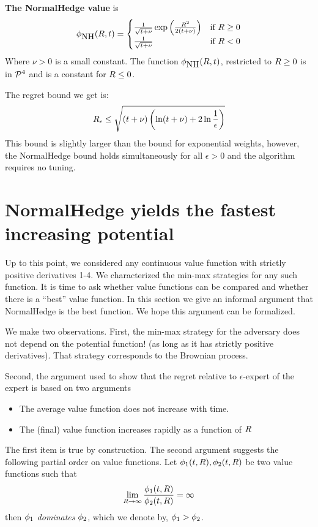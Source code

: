 \documentclass[12pt]{article} %
\begin{document}
{\bf The NormalHedge value} is
\begin{equation} \label{eqn:NormalHedge}
  \phi_{\mbox{NH}}(R,t) = \begin{cases}
    \frac{1}{\sqrt{t+\nu}}\exp\left(\frac{R^2}{2(t+\nu)}\right)
    & \mbox{if } R \geq 0  \\
  \frac{1}{\sqrt{t+\nu}} & \mbox{if } R <0
  \end{cases}
\end{equation}
Where $\nu>0$ is a small constant. The function $\phi_{\mbox{NH}}(R,t)$,
restricted to $R\geq 0$ is in ${\cal P}^{4}$ and is a constant for $R \leq 0$.

The regret bound we get is:
\begin{equation}
R_\epsilon \leq \sqrt{(t+\nu) \left( \ln (t+\nu) + 2 \ln \frac{1}{\epsilon}\right)}
\end{equation}
This bound is slightly larger than the bound for exponential weights,
however, the NormalHedge bound holds simultaneously for all
$\epsilon>0$ and the algorithm requires no tuning.


\section{NormalHedge yields the fastest increasing potential} \label{sec:NormalHedge}

Up to this point, we considered any continuous value function with
strictly positive derivatives 1-4. We characterized the min-max
strategies for any such function. It is time to ask whether value
functions can be compared and whether there is a ``best'' value
function. In this section we give an informal argument that
NormalHedge is the best function. We hope this argument can be
formalized.

We make two observations. First, the min-max strategy for the
adversary does not depend on the potential function! (as long as it
has strictly positive derivatives). That strategy corresponds to the
Brownian process.

Second, the argument used to show that the regret relative to
$\epsilon$-expert of the expert is based on two arguments
\begin{itemize}
\item The average value function does not increase with time.
\item The (final) value function increases rapidly as a function of $R$
\end{itemize}
The first item is true by construction. The second argument suggests
the following partial order on value functions. Let
$\phi_1(t,R),\phi_2(t,R)$ be two value functions such that
\[
\lim_{R \to \infty} \frac{\phi_1(t,R)}{\phi_2(t,R)} = \infty  
\]
then $\phi_1$ {\em dominates} $\phi_2$, which we denote by, $\phi_1 > \phi_2$.
\end{document}
